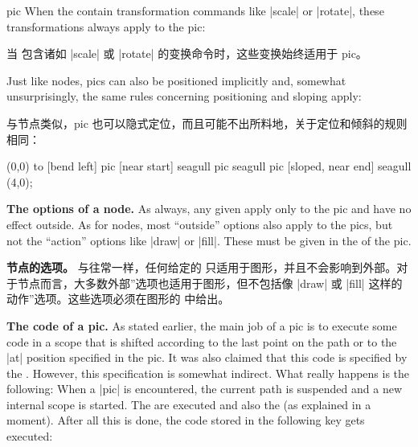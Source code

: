 \begin{pathoperation}{pic}
    When the  contain transformation commands like |scale| or
    |rotate|, these transformations always apply to the pic:
    
    当  包含诸如 |scale| 或 |rotate| 的变换命令时，这些变换始终适用于 pic。
\begin{codeexample}[
    pre={\tikzset{
  seagull/.pic={
    \draw (-3mm,0) to [bend left] (0,0) to [bend left] (3mm,0);
  },
}}]
\end{codeexample}

    Just like nodes, pics can also be positioned implicitly and, somewhat
    unsurprisingly, the same rules concerning positioning and sloping apply:
    
    与节点类似，pic 也可以隐式定位，而且可能不出所料地，关于定位和倾斜的规则相同：
\begin{codeexample}[
    pre={\tikzset{
  seagull/.pic={
    \draw (-3mm,0) to [bend left] (0,0) to [bend left] (3mm,0);
  },
}}]
\tikz \draw
  (0,0) to [bend left]
           pic [near start]       {seagull}
           pic                    {seagull}
           pic [sloped, near end] {seagull} (4,0);
\end{codeexample}

    \medskip
    \textbf{The options of a node.}
    As always, any given  apply only to the pic and have no
    effect outside. As for nodes, most ``outside'' options also apply to the
    pics, but not the ``action'' options like |draw| or |fill|. These must be
    given in the  of the pic.

    \textbf{节点的选项。}
与往常一样，任何给定的  只适用于图形，并且不会影响到外部。对于节点而言，大多数外部''选项也适用于图形，但不包括像 |draw| 或 |fill| 这样的动作''选项。这些选项必须在图形的  中给出。

    \medskip
    \textbf{The code of a pic.}
    As stated earlier, the main job of a pic is to execute some code in a scope
    that is shifted according to the last point on the path or to the |at|
    position specified in the pic. It was also claimed that this code is
    specified by the . However, this specification is somewhat
    indirect. What really happens is the following: When a |pic| is
    encountered, the current path is suspended and a new internal scope is
    started. The  are executed and also the  (as
    explained in a moment). After all this is done, the code stored in the
    following key gets executed:


\end{pathoperation}
